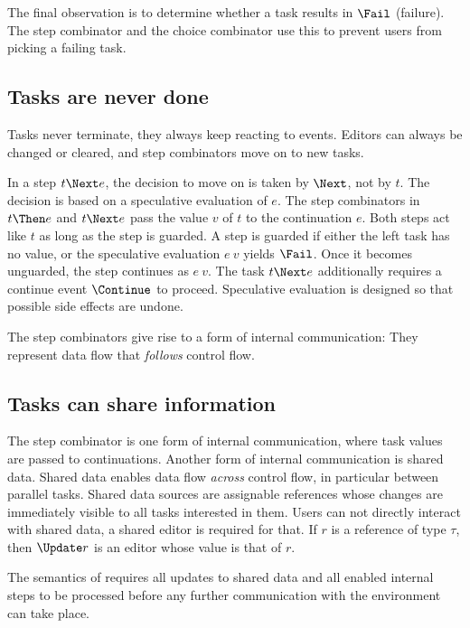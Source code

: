 The final observation is to determine whether a task results in $\Fail$ (failure).
The step combinator and the choice combinator use this to prevent users from picking a failing task.




\subsection{Tasks are never done}

Tasks never terminate, they always keep reacting to events.
Editors can always be changed or cleared, and step combinators move on to new tasks.

In a step $t \Next e$, the decision to move on is taken by $\Next$, not by $t$.
The decision is based on a speculative evaluation of $e$.
The step combinators in $t \Then e$ and $t \Next e$ pass the value $v$ of $t$ to the continuation $e$.
Both steps act like $t$ as long as the step is guarded.
A step is guarded if either the left task has no value, or the speculative evaluation $e\ v$ yields $\Fail$.
Once it becomes unguarded, the step continues as $e\ v$.
The task $t \Next e$ additionally requires a continue event $\Continue$ to proceed.
Speculative evaluation is designed so that possible side effects are undone.

The step combinators give rise to a form of internal communication:
They represent data flow that \emph{follows} control flow.



\subsection{Tasks can share information}

The step combinator is one form of internal communication, where task values are passed to continuations.
Another form of internal communication is shared data.
Shared data enables data flow \emph{across} control flow, in particular between parallel tasks.
Shared data sources are assignable references whose changes are immediately visible to all tasks interested in them.
Users can not directly interact with shared data, a shared editor is required for that.
If $r$ is a reference of type $\tau$, then $\Update r$ is an editor whose value is that of $r$.

The semantics of \TOPHAT requires all updates to shared data and all enabled internal steps to be processed before any further communication with the environment can take place.


